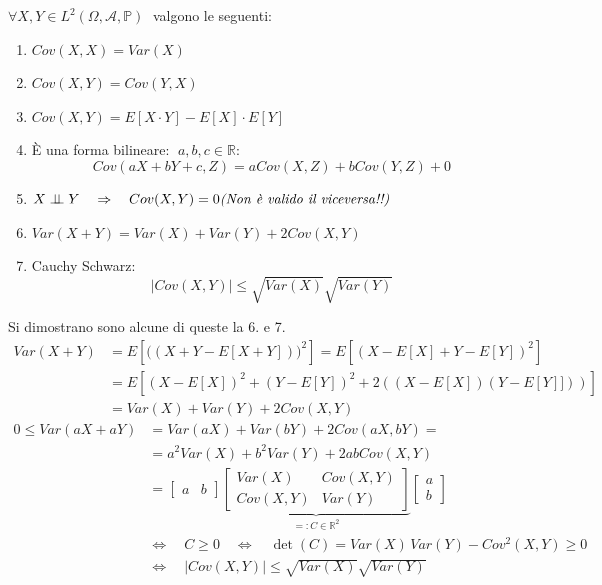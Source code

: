 \begin{teorema}
\label{th:propcov}
    $\forall X, Y\in L^2(\Omega, \mathcal{A}, \mathbb{P})\;$ valgono le seguenti:
    \begin{enumerate}
        \item $Cov(X, X) = Var(X)$
        \item $Cov(X, Y) = Cov(Y, X)$
        \item $Cov(X, Y) = E[X\cdot Y]-E[X]\cdot E[Y]$
        \item È una forma bilineare: $\;a, b, c\in\mathbb{R}$:
        \[Cov(aX+bY+c, Z) = a Cov(X, Z) + bCov(Y, Z) + 0\]
        \item $X\ind Y\quad \Rightarrow \quad Cov(X, Y)=0 \hfill \textit{(Non è valido il viceversa!!)}$
        \item $Var(X+Y) = Var(X) + Var(Y) + 2Cov(X, Y)$
        \item Cauchy Schwarz:
        \[\bigl|Cov(X, Y)\bigr|\leq \sqrt{Var(X)}\sqrt{Var(Y)}\]
     \end{enumerate}

     \begin{dimostrazione}
         Si dimostrano sono alcune di queste la 6. e 7.
        \begin{align*}Var(X+Y) & = E\left[\bigl((X+Y-E[X+Y])\bigr)^2\right] =        E\left[\left(X-E[X]+Y-E[Y]\right)^2\right]\\
            & = E\left[\left(X-E[X]\right)^2 + \left(Y-E[Y]\right)^2 + 2 \left((X-E[X])(Y-E[Y]])\right)\right] \\
            & =Var(X) + Var(Y) + 2Cov(X, Y)
         \end{align*}
        \begin{align*}
             0\leq Var(aX+aY) &= Var(aX) + Var(bY) + 2Cov(aX, bY)=\\
             & =a^2 Var(X) + b^2 Var(Y) + 2abCov(X, Y) \\
             & = \begin{bmatrix}a&b\end{bmatrix} \underbrace{\begin{bmatrix}
                 Var(X) & Cov(X, Y)\\
                 Cov(X, Y) & Var(Y)
             \end{bmatrix}}_{=:C\in \mathbb{R}^2} \begin{bmatrix}a\\b\end{bmatrix}\\
              &\iff \quad C \geq 0 \quad \iff \quad \det(C) = Var(X)\,Var(Y)-Cov^2(X, Y)\geq0\\
              &\iff \quad |Cov(X, Y)|\leq \sqrt{Var(X)}\sqrt{Var(Y)}
         \end{align*}
     \end{dimostrazione}
\end{teorema}

